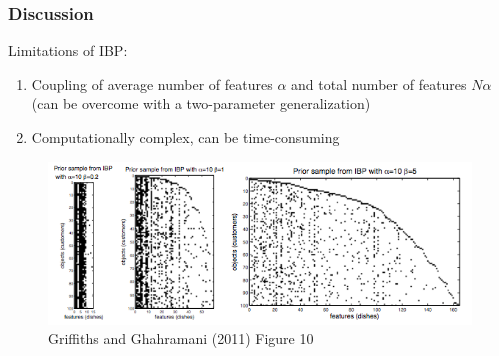 \documentclass[13pt]{beamer}
\begin{document}
\begin{frame}
\frametitle{Discussion}


Limitations of IBP:
\begin{enumerate}
\item Coupling of average number of features $\alpha$ and total number of features $N\alpha$ (can be overcome with a two-parameter generalization)
\item Computationally complex, can be time-consuming
\end{enumerate}

\begin{figure}
\begin{center}
\includegraphics[scale=0.3]{./img/two-parameter-ibp.png}
\caption{Griffiths and Ghahramani (2011) Figure 10}
\end{center}
\end{figure}

\end{frame}
 
\end{document}

